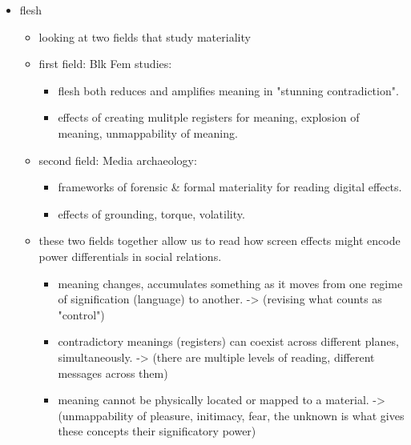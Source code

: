 \documentclass[11pt]{article}
\begin{document}
\begin{itemize}
\item flesh
\begin{itemize}
\item looking at two fields that study materiality
\item first field: Blk Fem studies:
\begin{itemize}
\item flesh both reduces and amplifies meaning in "stunning
contradiction".
\item effects of creating mulitple registers for meaning, explosion of
meaning, unmappability of meaning.
\end{itemize}
\item second field: Media archaeology:
\begin{itemize}
\item frameworks of forensic \& formal materiality for reading digital
effects.
\item effects of grounding, torque, volatility.
\end{itemize}
\item these two fields together allow us to read how screen effects
might encode power differentials in social relations. 
\begin{itemize}
\item meaning changes, accumulates something as it moves from one
regime of signification (language) to another.
-> (revising what counts as "control")
\item contradictory meanings (registers) can coexist across different
planes, simultaneously.
-> (there are multiple levels of reading, different messages
   across them)
\item meaning cannot be physically located or mapped to a material.
-> (unmappability of pleasure, initimacy, fear, the unknown is
   what gives these concepts their significatory power)
\end{itemize}
\end{itemize}


\end{itemize}
\end{document}
